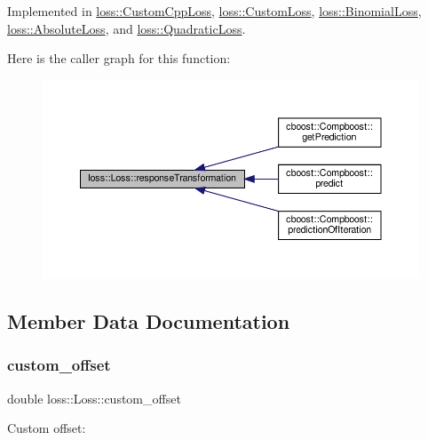 Implemented in \hyperlink{classloss_1_1_custom_cpp_loss_a8ef296a7db08423f68dd389824b5aa77}{loss\+::\+Custom\+Cpp\+Loss}, \hyperlink{classloss_1_1_custom_loss_a0db8657c96f53b08aedaddc2fdac973b}{loss\+::\+Custom\+Loss}, \hyperlink{classloss_1_1_binomial_loss_a6fb5f28518ac455cb192441660e7b997}{loss\+::\+Binomial\+Loss}, \hyperlink{classloss_1_1_absolute_loss_aa7e0ac902d905ae97f9e2d0337c6c058}{loss\+::\+Absolute\+Loss}, and \hyperlink{classloss_1_1_quadratic_loss_a0a7f1ed4a208326bed1ba5f1bb4d37e5}{loss\+::\+Quadratic\+Loss}.

Here is the caller graph for this function\+:\nopagebreak
\begin{figure}[H]
\begin{center}
\leavevmode
\includegraphics[width=350pt]{classloss_1_1_loss_a0a84b7df79b08e40b538aaa7e6ee75c4_icgraph}
\end{center}
\end{figure}


\subsection{Member Data Documentation}
\mbox{\label{classloss_1_1_loss_ae5dc373f54ed65ee0ca54a921ef826f4}} 
\subsubsection{\texorpdfstring{custom\+\_\+offset}{custom\_offset}}
{\footnotesize\ttfamily double loss\+::\+Loss\+::custom\+\_\+offset\hspace{0.3cm}{\ttfamily [protected]}}



Custom offset\+: 

